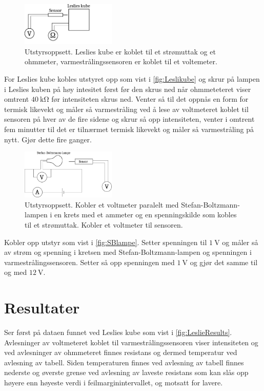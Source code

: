 \begin{figure}
  \centering
  \includegraphics[width=0.4\textwidth]{figures/leslikube.pdf}
  \caption{Utstyrsoppsett. Leslies kube er koblet til et strømuttak og et ohmmeter, varmestrålingssensoren er koblet til et voltemeter.}
  \label{fig:Leslikube}
\end{figure}

For Leslies kube kobles utstyret opp som vist i \autoref{fig:Leslikube} og skrur på lampen i Leslies kuben på høy intesitet først før den skrus ned når ohmmeteteret viser omtrent $\SI{40}{\kilo\ohm}$ før intensiteten skrus ned. Venter så til det oppnås en form for termisk likevekt og måler så varmestråling ved å lese av voltmeteret koblet til sensoren på hver av de fire sidene og skrur så opp intensiteten, venter i omtrent fem minutter til det er tilnærmet termisk likevekt og måler så varmestråling på nytt. Gjør dette fire ganger.

\begin{figure}
  \centering
  \includegraphics[width=0.4\textwidth]{figures/lampe.pdf}
  \caption{Utstyrsoppsett. Kobler et voltmeter paralelt med Stefan-Boltzmann-lampen i en krets med et ammeter og en spenningskilde som kobles til et strømuttak. Kobler et voltmeter til sensoren.}
  \label{fig:SBlampe}
\end{figure}

Kobler opp utstyr som vist i \autoref{fig:SBlampe}. Setter spenningen til $\SI{1}{\volt}$ og måler så av strøm og spenning i kretsen med Stefan-Boltzmann-lampen og spenningen i varmestrålingssensoren. Setter så opp spenningen med $\SI{1}{\volt}$ og gjør det samme til og med $\SI{12}{\volt}$.


\section{Resultater}
Ser først på dataen funnet ved Leslies kube som vist i \autoref{fig:LeslieResults}. Avlesninger av voltmeteret koblet til varmestrålingssensoren viser intensiteten og ved avlesninger av ohmmeteret finnes resistans og dermed temperatur ved avlesning av tabell. Siden temperaturen finnes ved avlesning av tabell finnes nederste og øverste grense ved avlesning av laveste resistans som kan slås opp høyere enn høyeste verdi i feilmarginintervallet, og motsatt for lavere.

